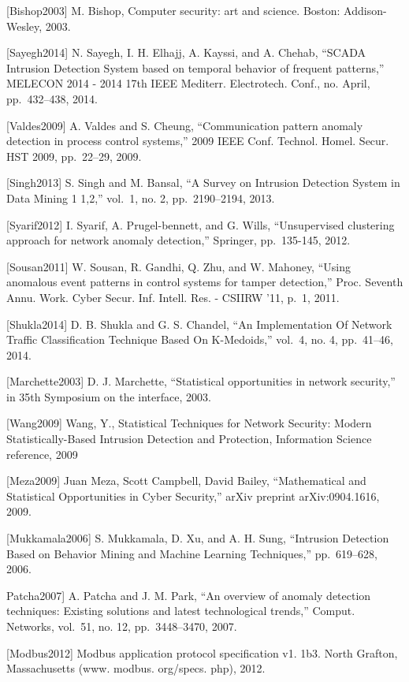 \documentclass[12pt,]{article}
\begin{document}
{[}Bishop2003{]} M. Bishop, Computer security: art and science. Boston:
Addison-Wesley, 2003.

{[}Sayegh2014{]} N. Sayegh, I. H. Elhajj, A. Kayssi, and A. Chehab,
``SCADA Intrusion Detection System based on temporal behavior of
frequent patterns,'' MELECON 2014 - 2014 17th IEEE Mediterr.
Electrotech. Conf., no. April, pp.~432--438, 2014.

{[}Valdes2009{]} A. Valdes and S. Cheung, ``Communication pattern
anomaly detection in process control systems,'' 2009 IEEE Conf. Technol.
Homel. Secur. HST 2009, pp.~22--29, 2009.

{[}Singh2013{]} S. Singh and M. Bansal, ``A Survey on Intrusion
Detection System in Data Mining 1 1,2,'' vol.~1, no. 2, pp.~2190--2194,
2013.

{[}Syarif2012{]} I. Syarif, A. Prugel-bennett, and G. Wills,
``Unsupervised clustering approach for network anomaly detection,''
Springer, pp.~135-145, 2012.

{[}Sousan2011{]} W. Sousan, R. Gandhi, Q. Zhu, and W. Mahoney, ``Using
anomalous event patterns in control systems for tamper detection,''
Proc. Seventh Annu. Work. Cyber Secur. Inf. Intell. Res. - CSIIRW '11,
p.~1, 2011.

{[}Shukla2014{]} D. B. Shukla and G. S. Chandel, ``An Implementation Of
Network Traffic Classification Technique Based On K-Medoids,'' vol.~4,
no. 4, pp.~41--46, 2014.

{[}Marchette2003{]} D. J. Marchette, ``Statistical opportunities in
network security,'' in 35th Symposium on the interface, 2003.

{[}Wang2009{]} Wang, Y., Statistical Techniques for Network Security:
Modern Statistically-Based Intrusion Detection and Protection,
Information Science reference, 2009

{[}Meza2009{]} Juan Meza, Scott Campbell, David Bailey, ``Mathematical
and Statistical Opportunities in Cyber Security,'' arXiv preprint
arXiv:0904.1616, 2009.

{[}Mukkamala2006{]} S. Mukkamala, D. Xu, and A. H. Sung, ``Intrusion
Detection Based on Behavior Mining and Machine Learning Techniques,''
pp.~619--628, 2006.

Patcha2007{]} A. Patcha and J. M. Park, ``An overview of anomaly
detection techniques: Existing solutions and latest technological
trends,'' Comput. Networks, vol.~51, no. 12, pp.~3448--3470, 2007.

{[}Modbus2012{]} Modbus application protocol specification v1. 1b3.
North Grafton, Massachusetts (www. modbus. org/specs. php), 2012.
\end{document}
